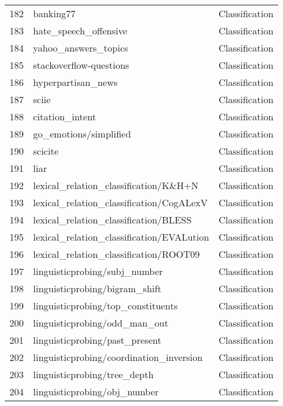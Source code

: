 \documentclass[11pt]{article}
\begin{document}
\begin{longtable}{lll}
182 & banking77 \citep{Casanueva2020} & Classification \\
183 & hate\_speech\_offensive \citep{hateoffensive} & Classification \\
184 & yahoo\_answers\_topics & Classification \\
185 & stackoverflow-questions & Classification \\
186 & hyperpartisan\_news & Classification \\
187 & sciie & Classification \\
188 & citation\_intent & Classification \\
189 & go\_emotions/simplified \citep{demszky2020goemotions} & Classification \\
190 & scicite \citep{Cohan2019Structural} & Classification \\
191 & liar \citep{wang-2017-liar} & Classification \\
192 & lexical\_relation\_classification/K\&H+N \citep{wang-etal-2019-spherere} & Classification \\
193 & lexical\_relation\_classification/CogALexV \citep{wang-etal-2019-spherere} & Classification \\
194 & lexical\_relation\_classification/BLESS \citep{wang-etal-2019-spherere} & Classification \\
195 & lexical\_relation\_classification/EVALution \citep{wang-etal-2019-spherere} & Classification \\
196 & lexical\_relation\_classification/ROOT09 \citep{wang-etal-2019-spherere} & Classification \\
197 & linguisticprobing/subj\_number \citep{conneau-etal-2018-cram} & Classification \\
198 & linguisticprobing/bigram\_shift \citep{conneau-etal-2018-cram} & Classification \\
199 & linguisticprobing/top\_constituents \citep{conneau-etal-2018-cram} & Classification \\
200 & linguisticprobing/odd\_man\_out \citep{conneau-etal-2018-cram} & Classification \\
201 & linguisticprobing/past\_present \citep{conneau-etal-2018-cram} & Classification \\
202 & linguisticprobing/coordination\_inversion \citep{conneau-etal-2018-cram} & Classification \\
203 & linguisticprobing/tree\_depth \citep{conneau-etal-2018-cram} & Classification \\
204 & linguisticprobing/obj\_number \citep{conneau-etal-2018-cram} & Classification \\

\end{longtable}
\end{document}
